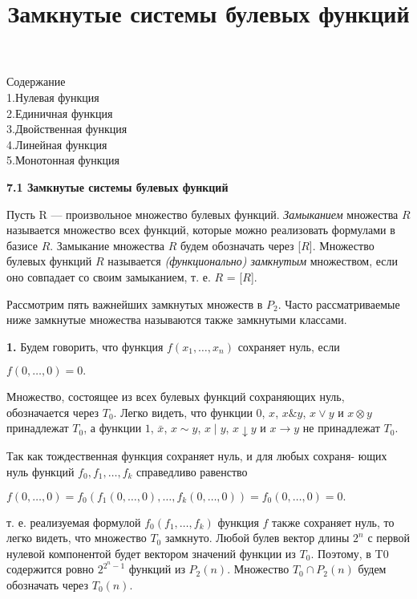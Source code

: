 \documentclass[10pt]{article}
\title{\bf{ Замкнутые системы булевых функций}}
\begin{document}
\maketitle
\begin{flushleft}
\large{Содержание}\\
1.Нулевая функция\\
2.Единичная функция\\
3.Двойственная функция\\
4.Линейная функция\\
5.Монотонная функция
\end{flushleft}
\newpage
\begin{flushleft}
\bf{7.1 \quad Замкнутые системы булевых функций}
\end{flushleft}
Пусть R — произвольное множество булевых функций. \textit{Замыканием} множества $R$
называется множество всех функций, которые можно реализовать
формулами в базисе $R$. Замыкание множества $R$ будем обозначать через [$R$].
Множество булевых функций $R$ называется \textit{(функционально) замкнутым}
множеством, если оно совпадает со своим замыканием, т. е. $R$ = [$R$]. \par
Рассмотрим пять важнейших замкнутых множеств в $P_2$. Часто рассматриваемые ниже замкнутые
множества называются также замкнутыми классами.\par
{\bf{1.}} Будем говорить, что функция $f(x_1,\dots,x_n)$ сохраняет нуль, если
\begin{center} $f(0,\dots, 0) = 0.$ \end{center}
Множество, состоящее из всех булевых функций сохраняющих нуль, обозначается
через $T_0$. Легко видеть, что функции $0$, $x$, $x\& y$, $x \vee y$ и $x \otimes y$
принадлежат $T_0$, а функции $1$, $\bar x$, $x \sim y$, $x \mid y$, $x \downarrow y$ и $x \to y$
 не принадлежат $T_0$. \par
Так как тождественная функция сохраняет нуль, и для любых сохраня-
ющих нуль функций ${f_0, f_1, \dots,f_k}$ справедливо равенство
\begin{center} $f(0, \dots, 0) = f_0(f_1(0, \dots, 0), \dots,f_k(0, \dots, 0)) = f_0(0, \dots, 0) = 0.$\end{center}
т. е. реализуемая формулой $f_0(f_1, \dots,f_k)$ функция $f$ также сохраняет нуль,
то легко видеть, что множество $T_0$ замкнуто.
Любой булев вектор длины $2^n$ с первой нулевой компонентой будет вектором
значений функции из $T_0$. Поэтому, в T0 содержится ровно $2^{2^n−1}$ функций
из $P_{2}(n)$. Множество $T_0 \cap P_{2}(n)$ будем обозначать через $T_{0}(n)$. \par
\end{document}
